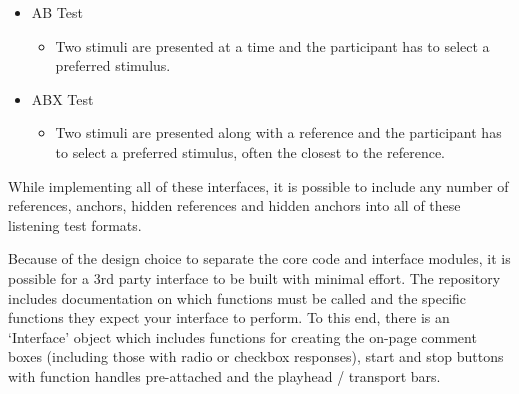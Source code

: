 \documentclass{sig-alternate}
\begin{document}
\begin{itemize}[noitemsep,nolistsep]
\begin{itemize}
		\end{itemize}
		\item AB Test~\cite{lipshitz1981great}
		\begin{itemize}
			\item Two stimuli are presented at a time and the participant has to select a preferred stimulus.
		\end{itemize}
		\item ABX Test~\cite{clark1982high}
		\begin{itemize}
			\item Two stimuli are presented along with a reference and the participant has to select a preferred stimulus, often the closest to the reference.
		\end{itemize}
	\end{itemize}
	
	While implementing all of these interfaces, it is possible to include any number of references, anchors, hidden references and hidden anchors into all of these listening test formats.
	
	Because of the design choice to separate the core code and interface modules, it is possible for a 3rd party interface to be built with minimal effort. The repository includes documentation on which functions must be called and the specific functions they expect your interface to perform. To this end, there is an `Interface' object which includes functions for creating the on-page comment boxes (including those with radio or checkbox responses), start and stop buttons with function handles pre-attached and the playhead / transport bars.
	
\end{document}
